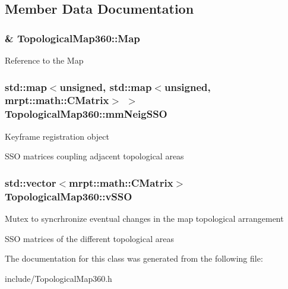 \subsection{Member Data Documentation}
\hypertarget{classTopologicalMap360_a0acbcd33de85764f4a9308aba73776ca}{
\subsubsection[{Map}]{\& Topological\-Map360\-::\-Map\hspace{0.3cm}{\ttfamily [private]}}}\label{classTopologicalMap360_a0acbcd33de85764f4a9308aba73776ca}
Reference to the Map \hypertarget{classTopologicalMap360_ab1627b97aa7b2120e21df7d5bd29b7d2}{
\subsubsection[{mm\-Neig\-S\-S\-O}]{\setlength{\rightskip}{0pt plus 5cm}std\-::map$<$unsigned, std\-::map$<$unsigned, mrpt\-::math\-::\-C\-Matrix$>$ $>$ Topological\-Map360\-::mm\-Neig\-S\-S\-O\hspace{0.3cm}{\ttfamily [private]}}}\label{classTopologicalMap360_ab1627b97aa7b2120e21df7d5bd29b7d2}
Keyframe registration object

S\-S\-O matrices coupling adjacent topological areas \hypertarget{classTopologicalMap360_a2cd7b8d445762886bdc2b902cbc6d818}{
\subsubsection[{v\-S\-S\-O}]{\setlength{\rightskip}{0pt plus 5cm}std\-::vector$<$mrpt\-::math\-::\-C\-Matrix$>$ Topological\-Map360\-::v\-S\-S\-O}}\label{classTopologicalMap360_a2cd7b8d445762886bdc2b902cbc6d818}
Mutex to syncrhronize eventual changes in the map topological arrangement

S\-S\-O matrices of the different topological areas 

The documentation for this class was generated from the following file\-:\begin{DoxyCompactItemize}
\item 
include/Topological\-Map360.\-h\end{DoxyCompactItemize}
